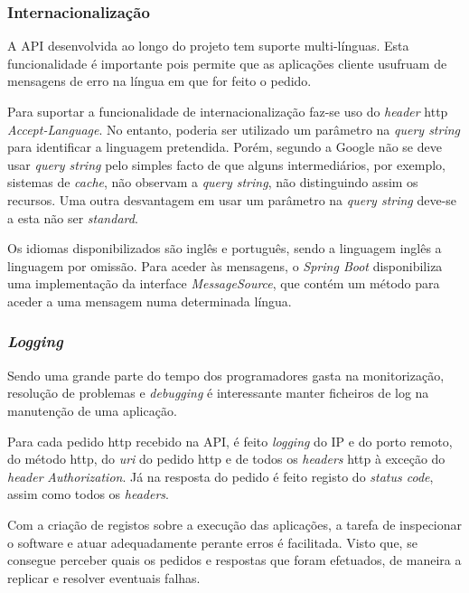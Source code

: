 \subsubsection{Internacionalização}

A API desenvolvida ao longo do projeto tem suporte multi-línguas. Esta funcionalidade é importante pois permite que as aplicações cliente usufruam de mensagens de erro na língua em que for feito o pedido. 

Para suportar a funcionalidade de internacionalização faz-se uso do \textit{header} \acrshort{http} \textit{Accept-Language}. No entanto, poderia ser utilizado um parâmetro na \textit{query string} para identificar a linguagem pretendida. Porém, segundo a Google \cite{LeverageBrowserCaching:google} não se deve usar \textit{query string} pelo simples facto de que alguns intermediários, por exemplo, sistemas de \textit{cache}, não observam a \textit{query string}, não distinguindo assim os recursos. Uma outra desvantagem em usar um parâmetro na \textit{query string} deve-se a esta não ser \textit{standard}. 

Os idiomas disponibilizados são inglês e português, sendo a linguagem inglês a linguagem por omissão. Para aceder às mensagens, o \textit{Spring Boot} disponibiliza uma implementação da interface \textit{MessageSource}, que contém um método para aceder a uma mensagem numa determinada língua.


\subsubsection{\textit{Logging}}

Sendo uma grande parte do tempo dos programadores gasta na monitorização, resolução de problemas e \textit{debugging} é interessante manter ficheiros de \acrfull{log} na manutenção de uma aplicação.

Para cada pedido \acrshort{http} recebido na API, é feito \textit{logging} do IP e do porto remoto, do método \acrshort{http}, do \textit{uri} do pedido \acrshort{http} e de todos os \textit{headers} \acrshort{http} à exceção do \textit{header} \textit{Authorization}. Já na resposta do pedido é feito registo do \textit{status code}, assim como todos os \textit{headers}. 

Com a criação de registos sobre a execução das aplicações, a tarefa de inspecionar o software e atuar adequadamente perante erros é facilitada. Visto que, se consegue perceber quais os pedidos e respostas que foram efetuados, de maneira a replicar e resolver eventuais falhas.


